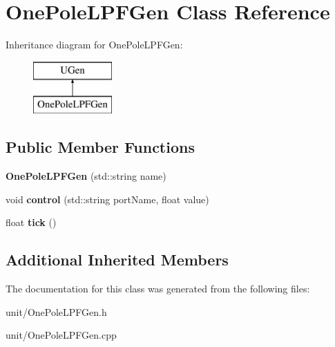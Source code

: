 \hypertarget{classOnePoleLPFGen}{}\section{One\+Pole\+L\+P\+F\+Gen Class Reference}
\label{classOnePoleLPFGen}
Inheritance diagram for One\+Pole\+L\+P\+F\+Gen\+:\begin{figure}[H]
\begin{center}
\leavevmode
\includegraphics[height=2.000000cm]{classOnePoleLPFGen}
\end{center}
\end{figure}
\subsection*{Public Member Functions}
\begin{DoxyCompactItemize}
\item 
{\bfseries One\+Pole\+L\+P\+F\+Gen} (std\+::string name)\hypertarget{classOnePoleLPFGen_aea39a9562852ac47fdd576fd8b583b9f}{}\label{classOnePoleLPFGen_aea39a9562852ac47fdd576fd8b583b9f}

\item 
void {\bfseries control} (std\+::string port\+Name, float value)\hypertarget{classOnePoleLPFGen_a8f2df9b7406edadf7dc34e7e65b2b67c}{}\label{classOnePoleLPFGen_a8f2df9b7406edadf7dc34e7e65b2b67c}

\item 
float {\bfseries tick} ()\hypertarget{classOnePoleLPFGen_a5e5288841ff8112113f2d6ec1f03f375}{}\label{classOnePoleLPFGen_a5e5288841ff8112113f2d6ec1f03f375}

\end{DoxyCompactItemize}
\subsection*{Additional Inherited Members}


The documentation for this class was generated from the following files\+:\begin{DoxyCompactItemize}
\item 
unit/One\+Pole\+L\+P\+F\+Gen.\+h\item 
unit/One\+Pole\+L\+P\+F\+Gen.\+cpp\end{DoxyCompactItemize}
